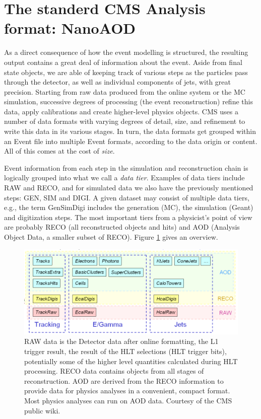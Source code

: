 \section{The standerd CMS Analysis format: NanoAOD}

As a direct consequence of how the event modelling is structured, the resulting output contains a great deal of information about the event. Aside from final state objects, we are able of keeping track of various steps as the particles pass through the detector, as well as individual components of jets, with great precision. Starting from raw data produced from the online system or the MC simulation, successive degrees of processing (the event reconstruction) refine this data, apply calibrations and create higher-level physics objects. CMS uses a number of data formats with varying degrees of detail, size, and refinement to write this data in its various stages. In turn, the data formats get grouped within an Event file into multiple Event formats, according to the data origin or content.  All of this comes at the cost of \emph{size}.

Event information from each step in the simulation and reconstruction chain is logically grouped into what we call a \emph{data tier}. Examples of data tiers include RAW and RECO, and for simulated data we also have the previously mentioned steps: GEN, SIM and DIGI. A given dataset may consist of multiple data tiers, e.g., the term GenSimDigi includes the generation (MC), the simulation (Geant) and digitization steps. The most important tiers from a physicist's point of view are probably RECO (all reconstructed objects and hits) and AOD (Analysis Object Data, a smaller subset of RECO). Figure \ref{fig:datatier} gives an overview. 

\begin{figure}
    \centering
     \includegraphics[width=\columnwidth]{gfx/ch2/whats_in_aod_reco.png}
    \caption[Data Tiers]{RAW data is the Detector data after online formatting, the L1 trigger result, the result of the HLT selections (HLT trigger bits), potentially some of the higher level quantities calculated during HLT processing. RECO data contains objects from all stages of reconstruction. AOD are derived from the RECO information to provide data for physics analyses in a convenient, compact format. Most physics analyses can run on AOD data. Courtesy of the CMS public wiki.}
    \label{fig:datatier}
\end{figure}

